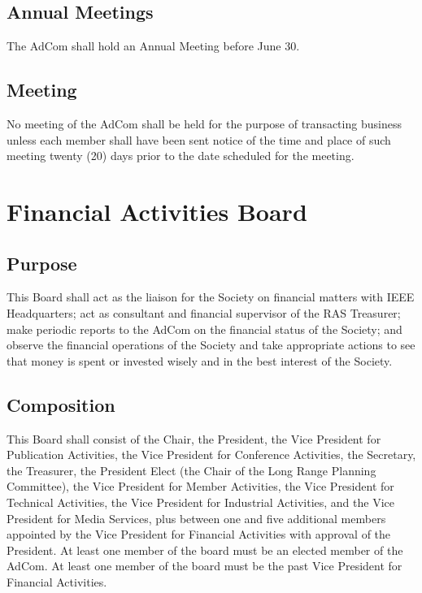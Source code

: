 \documentclass[10pt]{article}
\begin{document}
\subsection{Annual Meetings}
The AdCom shall hold an Annual Meeting before June 30.


\subsection{Meeting}

No meeting of the AdCom shall be held for the purpose of transacting business unless each member shall have been sent notice of the time and place of such meeting twenty (20) days prior to the date scheduled for the meeting. 


\section{Financial Activities Board}
\label{FAB}

\subsection{Purpose}
This Board shall act as the liaison for the Society on financial matters with IEEE Headquarters; act as consultant and financial supervisor of the RAS Treasurer; make periodic reports to the AdCom on the financial status of the Society; and observe the financial operations of the Society and take appropriate actions to see that money is spent or invested wisely and in the best interest of the Society.


\subsection{Composition}
This Board shall consist of the Chair, the President, the Vice President for Publication Activities, the Vice President for Conference Activities, the Secretary, the Treasurer, the President Elect (the Chair of the Long Range Planning Committee), the Vice President for Member Activities, the Vice President for Technical Activities, the Vice President for Industrial Activities, and the Vice President for Media Services, plus between one and five additional members appointed by the Vice President for Financial Activities with approval of the President. At least one member of the board must be an elected member of the AdCom. At least one member of the board must be the past Vice President for Financial Activities.
\end{document}
